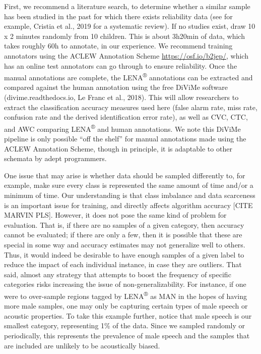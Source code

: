\documentclass[english,table,man,floatsintext]{apa6}
\begin{document}
First, we recommend a literature search, to determine whether a similar sample has been studied in the past for which there exists reliability data (see for example, Cristia et al., 2019 for a systematic review). If no studies exist, draw 10 x 2 minutes randomly from 10 children. This is about 3h20min of data, which takes roughly 60h to annotate, in our experience. We recommend training annotators using the ACLEW Annotation Scheme \url{https://osf.io/b2jep/}, which has an online test annotators can go through to ensure reliability. Once the manual annotations are complete, the LENA\textsuperscript{®} annotations can be extracted and compared against the human annotation using the free DiViMe software (divime.readthedocs.io, Le Franc et al., 2018). This will allow researchers to extract the classification accuracy measures used here (false alarm rate, miss rate, confusion rate and the derived identification error rate), as well as CVC, CTC, and AWC comparing LENA\textsuperscript{®} and human annotations. We note this DiViMe pipeline is only possible \enquote{off the shelf} for manual annotations made using the ACLEW Annotation Scheme, though in principle, it is adaptable to other schemata by adept programmers.

One issue that may arise is whether data should be sampled differently to, for example, make sure every class is represented the same amount of time and/or a minimum of time. Our understanding is that class imbalance and data scarceness is an important issue for training, and directly affects algorithm accuracy {[}CITE MARVIN PLS{]}. However, it does not pose the same kind of problem for evaluation. That is, if there are no samples of a given category, then accuracy cannot be evaluated; if there are only a few, then it is possible that these are special in some way and accuracy estimates may not generalize well to others. Thus, it would indeed be desirable to have enough samples of a given label to reduce the impact of each individual instance, in case they are outliers. That said, almost any strategy that attempts to boost the frequency of specific categories risks increasing the issue of non-generalizability. For instance, if one were to over-sample regions tagged by LENA\textsuperscript{®} as MAN in the hopes of having more male samples, one may only be capturing certain types of male speech or acoustic properties. To take this example further, notice that male speech is our smallest category, representing 1\% of the data. Since we sampled randomly or periodically, this represents the prevalence of male speech and the samples that are included are unlikely to be acoustically biased.
\end{document}
